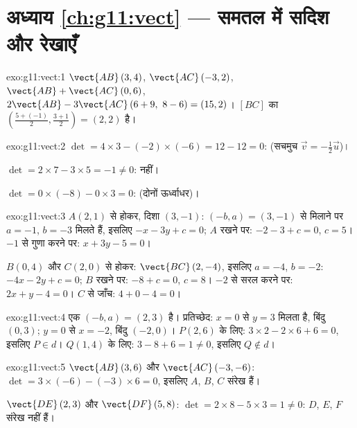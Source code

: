 \section*{अध्याय \ref{ch:g11:vect} --- समतल में सदिश और रेखाएँ}

\begin{solution}{exo:g11:vect:1}
$\vect{AB}\,(3, 4)$, $\vect{AC}\,(-3, 2)$, $\vect{AB} + \vect{AC}\,(0, 6)$, $2\vect{AB} - 3\vect{AC}\,(6 + 9,\ 8 - 6) = (15, 2)$। $[BC]$ का  $\left(\frac{5 + (-1)}{2}, \frac{3+1}{2}\right) = (2, 2)$ है।
\end{solution}

\begin{solution}{exo:g11:vect:2}
$\det = 4 \times 3 - (-2) \times (-6) = 12 - 12 = 0$:  (सचमुच $\vec v = -\frac12 \vec u$)।

$\det = 2 \times 7 - 3 \times 5 = -1 \neq 0$:  नहीं।

$\det = 0 \times (-8) - 0 \times 3 = 0$:  (दोनों ऊर्ध्वाधर)।
\end{solution}

\begin{solution}{exo:g11:vect:3}
$A(2,1)$ से होकर, दिशा $(3, -1)$: $(-b, a) = (3, -1)$ से मिलाने पर $a = -1$, $b = -3$ मिलते हैं, इसलिए $-x - 3y + c = 0$;
$A$ रखने पर: $-2 - 3 + c =
0$, $c = 5$। $-1$ से गुणा करने पर: $x + 3y - 5 = 0$।

$B(0,4)$ और $C(2,0)$ से होकर: $\vect{BC}\,(2, -4)$, इसलिए $a = -4$, $b = -2$: $-4x - 2y + c = 0$; $B$ रखने पर: $-8 + c = 0$,
$c = 8$। $-2$ से सरल करने पर: $2x + y - 4 = 0$। $C$ से जाँच: $4 + 0 - 4 = 0$।
\end{solution}

\begin{solution}{exo:g11:vect:4}
एक  $(-b, a) = (2, 3)$ है। प्रतिच्छेद: $x = 0$ से $y = 3$ मिलता है, बिंदु $(0, 3)$; $y = 0$
से $x = -2$, बिंदु $(-2, 0)$। $P(2,6)$ के लिए: $3 \times 2 - 2 \times 6 + 6 = 0$, इसलिए $P \in d$। $Q(1,4)$ के लिए: $3 - 8 + 6 = 1 \neq 0$,
इसलिए $Q \notin d$।
\end{solution}

\begin{solution}{exo:g11:vect:5}
$\vect{AB}\,(3, 6)$ और $\vect{AC}\,(-3, -6)$: $\det = 3 \times (-6) - (-3) \times 6 = 0$, इसलिए $A$, $B$, $C$ संरेख हैं।

$\vect{DE}\,(2, 3)$ और $\vect{DF}\,(5, 8)$: $\det = 2 \times 8 - 5 \times 3 = 1 \neq 0$: $D$, $E$, $F$ संरेख नहीं हैं।
\end{solution}

